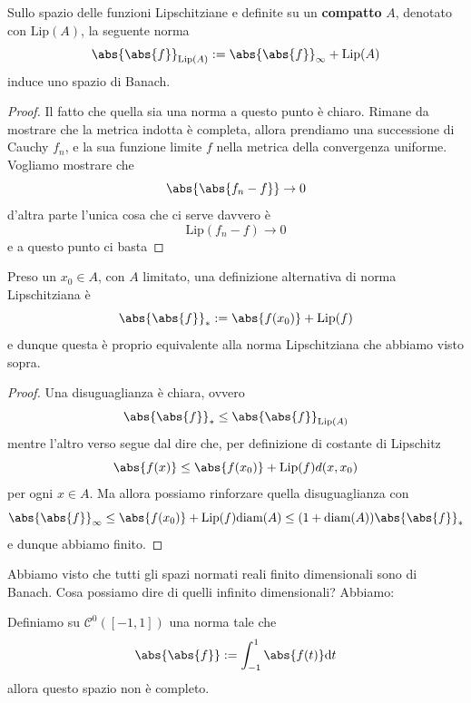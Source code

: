 \documentclass[11pt]{scrartcl}
\newcommand{\dif}{\text{d}}
\begin{document}
	\begin{example}
		Sullo spazio delle funzioni Lipschitziane e definite su un \textbf{compatto} $A$, denotato con $\text{Lip}(A)$, la seguente norma
		$$\abs{\abs{f}}_{\text{Lip}(A)}:=\abs{\abs{f}}_\infty+\text{Lip}(A)$$
		induce uno spazio di Banach.
	\end{example}
	\begin{proof}
		Il fatto che quella sia una norma a questo punto è chiaro. Rimane da mostrare che la metrica indotta è completa, allora prendiamo una successione di Cauchy $f_n$, e la sua funzione limite $f$ nella metrica della convergenza uniforme. Vogliamo mostrare che
		$$\abs{\abs{f_n-f}}\to 0$$
		d'altra parte l'unica cosa che ci serve davvero è 
		$$\text{Lip}(f_n-f)\to 0$$
		e a questo punto ci basta
	\end{proof}
	\begin{proposition}
		Preso un $x_0\in A$, con $A$ limitato, una definizione alternativa di norma Lipschitziana è
		$$\abs{\abs{f}}_*:=\abs{f(x_0)}+\text{Lip}(f)$$
		e dunque questa è proprio equivalente alla norma Lipschitziana che abbiamo visto sopra. 
	\end{proposition}
	\begin{proof}
		Una disuguaglianza è chiara, ovvero
		$$\abs{\abs{f}}_*\le \abs{\abs{f}}_{\text{Lip}(A)}$$
		mentre l'altro verso segue dal dire che, per definizione di costante di Lipschitz
		$$\abs{f(x)}\le \abs{f(x_0)}+\text{Lip}(f)d(x,x_0)$$
		per ogni $x\in A$. Ma allora possiamo rinforzare quella disuguaglianza con
		$$\abs{\abs{f}}_\infty\le \abs{f(x_0)}+\text{Lip}(f)\text{diam}(A)\le (1+\text{diam}(A))\abs{\abs{f}}_*$$
		e dunque abbiamo finito.
	\end{proof}
	Abbiamo visto che tutti gli spazi normati reali finito dimensionali sono di Banach. Cosa possiamo dire di quelli infinito dimensionali? Abbiamo:
	\begin{example}
		Definiamo su $\mathcal{C}^0([-1,1])$ una norma tale che
		$$\abs{\abs{f}}:=\int_{-1}^1 \abs{f(t)}\dif t$$
		allora questo spazio non è completo.
	\end{example}
\end{document}
